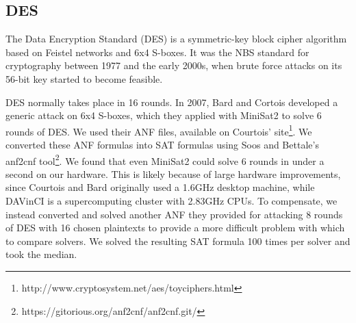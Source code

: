 \subsection{DES}
\label{sec:encoding:des}

The Data Encryption Standard (DES) is a symmetric-key block cipher algorithm based on Feistel networks and 6x4 S-boxes. It was the NBS standard for cryptography between 1977 and the early 2000s, when brute force attacks on its 56-bit key started to become feasible.\cite{Simmons16}

DES normally takes place in 16 rounds. In 2007, Bard and Cortois\cite{CB07} developed a generic attack on 6x4 S-boxes, which they applied with MiniSat2 to solve 6 rounds of DES.  We used their ANF files, available on Courtois' site\footnote{http://www.cryptosystem.net/aes/toyciphers.html}. We converted these ANF formulas into SAT formulas using Soos and Bettale's anf2cnf tool\footnote{https://gitorious.org/anf2cnf/anf2cnf.git/}. We found that even MiniSat2 could solve 6 rounds in under a second on our hardware. This is likely because of large hardware improvements, since Courtois and Bard originally used a 1.6GHz desktop machine, while DAVinCI is a supercomputing cluster with 2.83GHz CPUs. To compensate, we instead converted and solved another ANF they provided for attacking 8 rounds of DES with 16 chosen plaintexts to provide a more difficult problem with which to compare solvers. We solved the resulting SAT formula 100 times per solver and took the median.